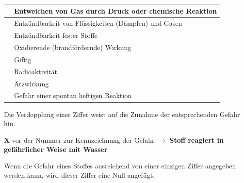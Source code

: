 \documentclass{article}
\newcommand\gEs[1]{\textbf{\textcolor[rgb]{0.0,0.0,0.5019608}{#1}}}
\newcommand\gEs[1]{\textbf{\textcolor[rgb]{0.0,0.0,0.5019608}{#1}}}
\newcommand\gT[1]{\textbf{\textup{\textcolor[rgb]{0.0,0.5019608,0.0}{#1}}}}
\begin{document}
\begin{flushleft}
\tablehead{}\begin{supertabular}{|m{0.97999996cm}m{12.317cm}|}
\hline
{}\par

 &
{\mdseries Entweichen von Gas durch Druck oder chemische Reaktion}

\\\hline
{}\par

 &
{\mdseries Entz\"undbarkeit von Fl\"ussigkeiten (D\"ampfen) und Gasen}

\\\hline
{}\par

 &
{\mdseries Entz\"undbarkeit fester Stoffe}

\\\hline
{}\par

 &
{\mdseries Oxidierende (brandf\"ordernde) Wirkung}

\\\hline
{}\par

 &
{\mdseries Giftig}

\\\hline
{}\par

 &
{\mdseries Radioaktivit\"at}

\\\hline
{}\par

 &
{\mdseries \"Atzwirkung}

\\\hline
{}\par

 &
{\mdseries Gefahr einer spontan heftigen Reaktion}

\\\hline
\end{supertabular}
\end{flushleft}
{\mdseries
Die Verdopplung einer Ziffer weist auf die Zunahme der entsprechenden 
Gefahr hin.}

{\mdseries
\gT{X}  vor der Nummer zur Kennzeichnung der Gefahr
${\rightarrow}$ \gEs{Stoff reagiert in 
gef\"ahrlicher Weise mit Wasser}}

{\mdseries
Wenn die Gefahr eines Stoffes ausreichend von einer einzigen Ziffer 
angegeben werden kann, wird dieser Ziffer eine Null angef\"ugt.}
\end{document}
